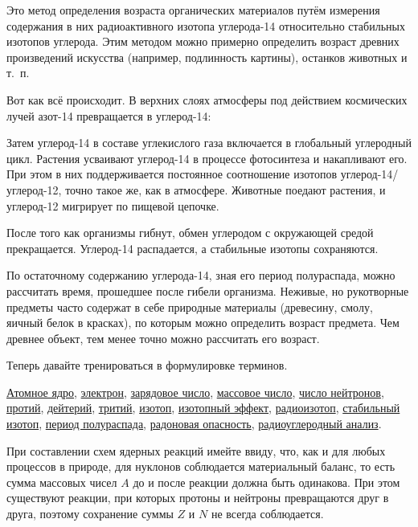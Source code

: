 Это метод определения возраста органических материалов путём измерения содержания в них радиоактивного изотопа углерода-14 относительно стабильных изотопов углерода. Этим методом можно примерно определить возраст древних произведений искусства (например, подлинность картины), останков животных и т.~п.

Вот как всё происходит. В верхних слоях атмосферы под действием космических лучей азот-14 превращается в углерод-14:


Затем углерод-14 в составе углекислого газа включается в глобальный углеродный цикл. Растения усваивают углерод-14 в процессе фотосинтеза и накапливают его. При этом в них поддерживается постоянное соотношение изотопов углерод-14/углерод-12, точно такое же, как в атмосфере. Животные поедают растения, и углерод-12 мигрирует по пищевой цепочке.

После того как организмы гибнут, обмен углеродом с окружающей средой прекращается. Углерод-14 распадается, а стабильные изотопы сохраняются.

По остаточному содержанию углерода-14, зная его период полураспада, можно рассчитать время, прошедшее после гибели организма. Неживые, но рукотворные предметы часто содержат в себе природные материалы (древесину, смолу, яичный белок в красках), по которым можно определить возраст предмета. Чем древнее объект, тем менее точно можно рассчитать его возраст.

Теперь давайте тренироваться в формулировке терминов.

\begin{termlist}
    \hyperref[term:atomic_nucleus]{Атомное ядро},
    \hyperref[term:electron]{электрон},
    \hyperref[term:atomic_number]{зарядовое число},
    \hyperref[term:mass_number]{массовое число},
    \hyperref[term:neutron_number]{число нейтронов},
    \hyperref[term:protium]{протий},
    \hyperref[term:deuterium]{дейтерий},
    \hyperref[term:tritium]{тритий},
    \hyperref[term:isotope]{изотоп},
    \hyperref[term:isotopic_effect]{изотопный эффект},
    \hyperref[term:radioisotope]{радиоизотоп},
    \hyperref[term:stable_isotope]{стабильный изотоп},
    \hyperref[term:half-life]{период полураспада},
    \hyperref[term:radon_hazard]{радоновая опасность},
    \hyperref[term:radiocarbon_dating]{радиоуглеродный анализ}.
\end{termlist}

При составлении схем ядерных реакций имейте ввиду, что, как и для любых процессов в природе, для нуклонов соблюдается материальный баланс, то есть сумма массовых чисел $A$ до и после реакции должна быть одинакова. При этом существуют реакции, при которых протоны и нейтроны превращаются друг в друга, поэтому сохранение суммы $Z$ и $N$ не всегда соблюдается.

